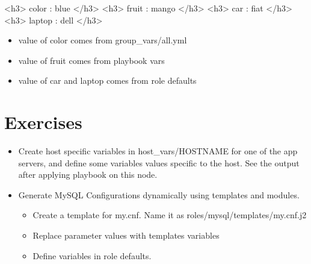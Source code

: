 \begin{code}
<h3> color     : blue </h3>
<h3> fruit     : mango </h3>
<h3> car       : fiat </h3>
<h3> laptop    : dell </h3>
\end{code}

\begin{itemize}
\item value of color comes from group\_vars/all.yml
\item value of fruit comes from playbook vars
\item value of car and laptop comes from role defaults
\end{itemize}

\section{Exercises}

\begin{itemize}
\item Create host specific variables in host\_vars/HOSTNAME for one of the app servers, and define some variables values specific to the host. See the output after applying playbook on this node.  
\item Generate MySQL Configurations dynamically using templates and modules.  

\begin{itemize}
\item Create a template for my.cnf.  Name it as roles/mysql/templates/my.cnf.j2  
\item Replace parameter values with templates variables  
\item Define variables in role defaults.
\end{itemize}
\end{itemize}